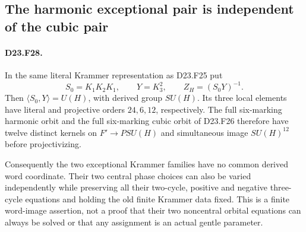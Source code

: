 \subsection{The harmonic exceptional pair is independent of the cubic pair}

\paragraph{D23.F28.}
In the same literal Krammer representation as D23.F25 put
\[
 S_0=K_1K_2K_1,\qquad Y=K_3^2,\qquad Z_H=(S_0Y)^{-1}.
\]
Then $\langle S_0,Y\rangle=U(H)$, with derived group $SU(H)$.
Its three local elements have literal and projective orders
$24,6,12$, respectively.  The full six-marking harmonic orbit
and the full six-marking cubic orbit of D23.F26 therefore have
twelve distinct kernels on $F'\to PSU(H)$ and simultaneous
image $SU(H)^{12}$ before projectivizing.

Consequently the two exceptional Krammer families have no
common derived word coordinate.  Their two central phase choices
can also be varied independently while preserving all their
two-cycle, positive and negative three-cycle equations and
holding the old finite Krammer data fixed.  This is a finite
word-image assertion, not a proof that their two noncentral
orbital equations can always be solved or that any assignment
is an actual gentle parameter.


